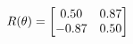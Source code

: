 \documentclass[preview]{standalone}
\begin{document}
\begin{align*}
\special{dvisvgm:raw <g id='unique000'>}R(\theta) = \begin{bmatrix}0.50 & 0.87\\-0.87 & 0.50\end{bmatrix}\special{dvisvgm:raw </g>}
\end{align*}
\end{document}
